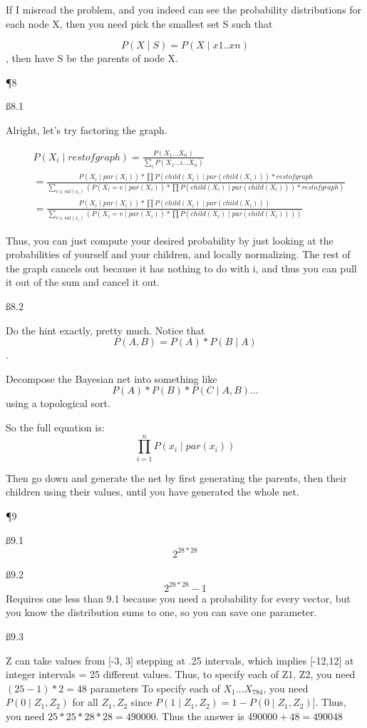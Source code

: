 If I misread the problem, and you indeed can see the probability distributions for each node X, then you need pick the smallest set S such that

\[
P(X \mid S) = P(X \mid x1..xn)\], then have S be the parents of node X.

\P 8

\ss{8.1}

Alright, let's try factoring the graph.

\begin{align*}
& P(X_i \mid restofgraph) = \frac{P(X_1 \dots X_n)}{\sum_{i} P(X_1 \dots i \dots X_n)}
\\
& = \frac{P(X_i \mid par(X_i)) * \prod P(child(X_i) \mid par(child(X_i))) * restofgraph}{\sum_{v \in val(x_i)} (P(X_i = v\mid par(X_i)) * \prod P(child(X_i) \mid par(child(X_i))) * restofgraph) }
\\
& = \frac{P(X_i \mid par(X_i)) * \prod P(child(X_i) \mid par(child(X_i)))}{\sum_{v \in val(x_i)} (P(X_i = v \mid par(X_i)) * \prod P(child(X_i) \mid par(child(X_i)))) }
\end{align*}

Thus, you can just compute your desired probability by just looking at the probabilities of yourself and your children, and locally normalizing. The rest of the graph cancels out because it has nothing to do with i, and thus you can pull it out of the sum and cancel it out.

\ss{8.2}

Do the hint exactly, pretty much. Notice that
\[ P(A,B) = P(A)*P(B \mid A)\].

Decompose the Bayesian net into something like 
\[P(A) * P(B) * P(C \mid A,B) \dots\] using a topological sort.

So the full equation is:
\[
\prod_{i=1}^{n} P(x_i \mid par(x_i))
\]

Then go down and generate the net by first generating the parents, then their children using their values, until you have generated the whole net.

\P 9

\ss{9.1}
\[
2^{28*28}
\]

\ss{9.2}
\[
2^{28*28} - 1
\]
Requires one less than 9.1 because you need a probability for every vector, but you know the distribution sums to one, so you can save one parameter.

\ss{9.3}

Z can take values from [-3, 3] stepping at .25 intervals, which implies [-12,12] at integer intervals = 25 different values. Thus, to specify each of Z1, Z2, you need $(25-1)*2 = 48$ parameters
\pb
To specify each of $X_1 \dots X_{784}$, you need $P(0 \mid Z_1, Z_2)$ for all $Z_1, Z_2$ since $P(1 \mid Z_1, Z_2) = 1 - P(0 \mid Z_1, Z_2)$]. Thus, you need $ 25*25*28*28 = 490000$. Thus the answer is $490000 + 48 = 490048$

